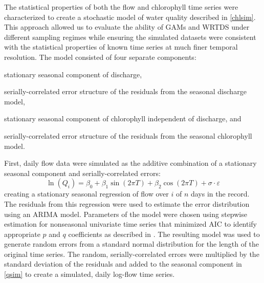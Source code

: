 \documentclass[letterpaper,12pt,oneside]{article}\usepackage[]{graphicx}\usepackage[]{color}
\begin{document}
The statistical properties of both the flow and chlorophyll time series were characterized to create a stochastic model of water quality described in \cref{chlsim}.  This approach allowed us to evaluate the ability of \acp{GAM} and \ac{WRTDS} under different sampling regimes while ensuring the simulated datasets were consistent with the statistical properties of known time series at much finer temporal resolution.  The model consisted of four separate components: \begin{inparaenum}[1\upshape)]
\item stationary seasonal component of discharge,
\item serially-correlated error structure of the residuals from the seasonal discharge model, 
\item stationary seasonal component of chlorophyll independent of discharge, and
\item serially-correlated error structure of the residuals from the seasonal chlorophyll model.
\end{inparaenum}
First, daily flow data were simulated as the additive combination of a stationary seasonal component and serially-correlated errors:
\begin{equation} \label{qsim}
\ln\left(Q_{i}\right) = \beta_0 + \beta_1 \sin\left(2\pi T\right) + \beta_2 \cos\left(2\pi T\right) + \sigma\cdot\varepsilon
\end{equation}
creating a stationary seasonal regression of flow over $i$ of $n$ days in the record.  The residuals from this regression were used to estimate the error distribution using an \ac{ARIMA} model.  Parameters of the model were chosen using stepwise estimation for nonseasonal univariate time series that minimized \ac{AIC} to identify appropriate $p$ and $q$ coefficients as described in \citet{Hyndman08}.  The resulting model was used to generate random errors from a standard normal distribution for the length of the original time series.  The random, serially-correlated errors were multiplied by the standard deviation of the residuals and added to the seasonal component in \cref{qsim} to create a simulated, daily log-flow time series.  
\end{document}
